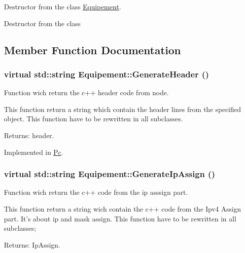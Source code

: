 Destructor from the class \hyperlink{class_equipement}{Equipement}. 

Destructor from the class 

\subsection{Member Function Documentation}
\hypertarget{class_equipement_136cc8d242b48a665691f8edafa48210}{
\subsubsection[{GenerateHeader}]{\setlength{\rightskip}{0pt plus 5cm}virtual std::string Equipement::GenerateHeader ()}}
\label{class_equipement_136cc8d242b48a665691f8edafa48210}


Function wich return the c++ header code from node. 

This function return a string which contain the header lines from the specified object. This function have to be rewritten in all subclasses.

\begin{Desc}
\item[Returns:]header. \end{Desc}


Implemented in \hyperlink{class_pc_0b152acc530cc73f502f046e19f9344f}{Pc}.\hypertarget{class_equipement_74f771f93374710e8aa42ae17e6b54b4}{
\subsubsection[{GenerateIpAssign}]{\setlength{\rightskip}{0pt plus 5cm}virtual std::string Equipement::GenerateIpAssign ()}}
\label{class_equipement_74f771f93374710e8aa42ae17e6b54b4}


Function wich return the c++ code from the ip asssign part. 

This function return a string wich contain the c++ code from the Ipv4 Assign part. It's about ip and mask assign. This function have to be rewritten in all subclasses;

\begin{Desc}
\item[Returns:]IpAssign. \end{Desc}


